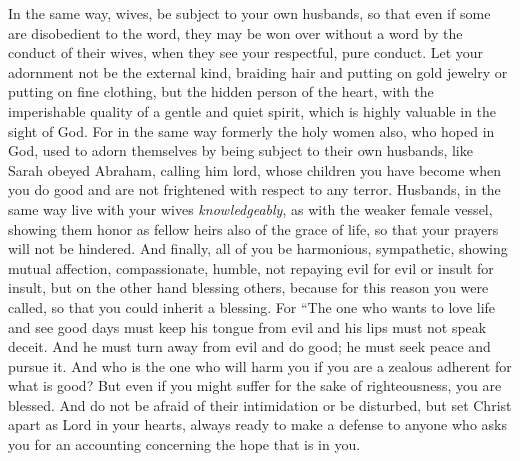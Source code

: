 \begin{biblechapter} %
 In the same way, wives, be subject to your own husbands, so that even if some are disobedient to the word, they may be won over without a word by the conduct of their wives,
\verse when they see your respectful, pure conduct.
\verse Let your adornment not be the external kind, braiding hair and putting on gold jewelry or putting on fine clothing,
\verse but the hidden person of the heart, with the imperishable quality of a gentle and quiet spirit, which is highly valuable in the sight of God.
\verse For in the same way formerly the holy women also, who hoped in God, used to adorn themselves by being subject to their own husbands,
\verse like Sarah obeyed Abraham, calling him lord, whose children you have become when you do good and are not frightened with respect to any terror.
\verse Husbands, in the same way live with your wives \textit{knowledgeably}, as with the weaker female vessel, showing them honor as fellow heirs also of the grace of life, so that your prayers will not be hindered.
 And finally, all of you be harmonious, sympathetic, showing mutual affection, compassionate, humble,
\verse not repaying evil for evil or insult for insult, but on the other hand blessing others, because for this reason you were called, so that you could inherit a blessing.
\verse For
\verse “The one who wants to love life 
and see good days 
must keep his tongue from evil 
and his lips must not speak deceit.
\verse And he must turn away from evil and do good; 
he must seek peace and pursue it.
 And who is the one who will harm you if you are a zealous adherent for what is good?
\verse But even if you might suffer for the sake of righteousness, you are blessed. And do not be afraid of their intimidation or be disturbed,
\verse but set Christ apart as Lord in your hearts, always ready to make a defense to anyone who asks you for an accounting concerning the hope that is in you.

\end{biblechapter}
